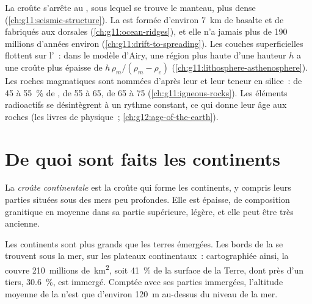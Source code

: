 \begin{recall}
La croûte s'arrête au , sous lequel se trouve le manteau, plus dense
(\cref{ch:g11:seismic-structure}). La  est formée d'environ
\qty{7}{km} de basalte et de  fabriqués aux dorsales
(\cref{ch:g11:ocean-ridges}), et elle n'a jamais plus de 190 millions
d'années environ (\cref{ch:g11:drift-to-spreading}). Les couches
superficielles flottent sur l'~: dans le modèle d'Airy, une
région plus haute d'une hauteur $h$ a une croûte plus épaisse de $h\,\rho_m/(\rho_m -
\rho_c)$ (\cref{ch:g11:lithosphere-asthenosphere}). Les
roches magmatiques sont nommées d'après leur  et leur teneur en
silice~:  de 45 à \qty{55}{\percent} de ,  de
55 à 65,  de 65 à 75 (\cref{ch:g11:igneous-rocks}). Les éléments
radioactifs se désintègrent à un rythme constant, ce qui donne leur âge aux
roches (les livres de physique~; \cref{ch:g12:age-of-the-earth}).
\end{recall}

\section{De quoi sont faits les continents}

\begin{definition}\label{def:g12:continental-crust:continental-crust}
La \emph{croûte continentale}
est la croûte qui forme les continents, y compris leurs parties situées sous
des mers peu profondes. Elle est épaisse, de composition granitique en
moyenne dans sa partie supérieure, légère, et elle peut être très ancienne.
\end{definition}

Les continents sont plus grands que les terres émergées. Les bords de la
 se trouvent sous la mer, sur les plateaux
continentaux~: cartographiée ainsi, la  couvre
\num{210}~millions de~\unit{km^2}, soit \qty{41}{\percent} de la surface de
la Terre, dont près d'un tiers, \qty{30.6}{\percent}, est immergé. Comptée
avec ses parties immergées, l'altitude moyenne de la 
n'est que d'environ \qty{120}{m} au-dessus du niveau de la mer.

